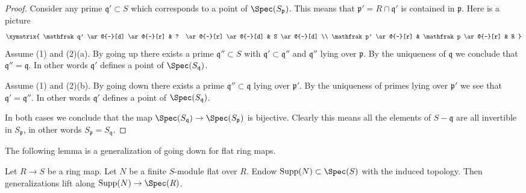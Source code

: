 \begin{proof}
Consider any prime $\mathfrak q' \subset S$ which corresponds to
a point of $\Spec(S_{\mathfrak p})$. This means that
$\mathfrak p' = R \cap \mathfrak q'$ is contained in $\mathfrak p$.
Here is a picture
$$
\xymatrix{
\mathfrak q' \ar@{-}[d] \ar@{-}[r] & ? \ar@{-}[r] \ar@{-}[d] & S \ar@{-}[d] \\
\mathfrak p' \ar@{-}[r] & \mathfrak p \ar@{-}[r] & R
}
$$
Assume (1) and (2)(a).
By going up there exists a prime $\mathfrak q'' \subset S$
with $\mathfrak q' \subset \mathfrak q''$ and $\mathfrak q''$
lying over $\mathfrak p$. By the uniqueness of $\mathfrak q$ we
conclude that $\mathfrak q'' = \mathfrak q$. In other words
$\mathfrak q'$ defines a point of $\Spec(S_{\mathfrak q})$.

\medskip\noindent
Assume (1) and (2)(b).
By going down there exists a prime $\mathfrak q'' \subset \mathfrak q$
lying over $\mathfrak p'$. By the uniqueness of primes lying over
$\mathfrak p'$ we see that $\mathfrak q' = \mathfrak q''$.  In other words
$\mathfrak q'$ defines a point of $\Spec(S_{\mathfrak q})$.

\medskip\noindent
In both cases we conclude that the map
$\Spec(S_{\mathfrak q}) \to \Spec(S_{\mathfrak p})$
is bijective. Clearly this means all the elements of $S - \mathfrak q$
are all invertible in $S_{\mathfrak p}$, in other words
$S_{\mathfrak p} = S_{\mathfrak q}$.
\end{proof}

\noindent
The following lemma is a generalization of going down for
flat ring maps.

\begin{lemma}
\label{lemma-going-down-flat-module}
Let $R \to S$ be a ring map. Let $N$ be a finite $S$-module flat over $R$.
Endow $\text{Supp}(N) \subset \Spec(S)$ with the induced topology.
Then generalizations lift along $\text{Supp}(N) \to \Spec(R)$.
\end{lemma}


